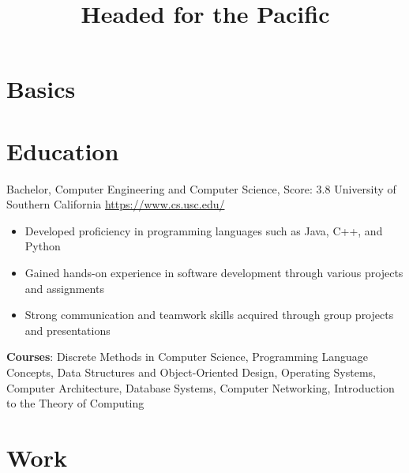 \documentclass[a4paper, serif, 10pt]{moderncv}
\title{Headed for the Pacific}
\begin{document}
\maketitle

\section{Basics}

\section{Education}

        {Bachelor, Computer Engineering and Computer Science, Score: 3.8}
        {University of Southern California}
        {\url{https://www.cs.usc.edu/}}
        {}
        {\begin{itemize}
\item Developed proficiency in programming languages such as Java, C++, and Python
\item Gained hands-on experience in software development through various projects and assignments
\item Strong communication and teamwork skills acquired through group projects and presentations
\end{itemize}
\textbf{Courses}: Discrete Methods in Computer Science, Programming Language Concepts, Data Structures and Object-Oriented Design, Operating Systems, Computer Architecture, Database Systems, Computer Networking, Introduction to the Theory of Computing}
\section{Work}
\end{document}
